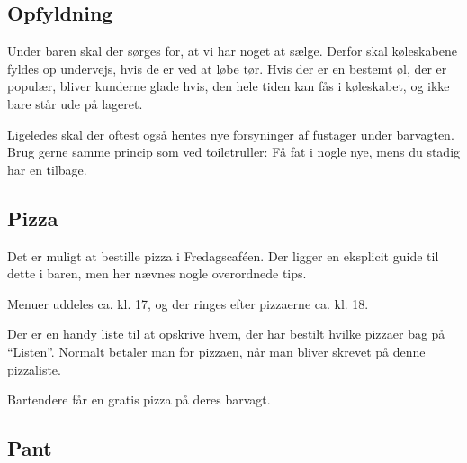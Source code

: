 \subsection{Opfyldning}
\label{sec:intra:opfyldning}

Under baren skal der sørges for, at vi har noget at sælge. Derfor skal
køleskabene fyldes op undervejs, hvis de er ved at løbe tør. Hvis der
er en bestemt øl, der er populær, bliver kunderne glade hvis, den hele
tiden kan fås i køleskabet, og ikke bare står ude på lageret.

Ligeledes skal der oftest også hentes nye forsyninger af fustager
under barvagten. Brug gerne samme princip som ved toiletruller: Få fat
i nogle nye, mens du stadig har en tilbage.

\subsection{Pizza}
\label{sec:intra:pizza}

Det er muligt at bestille pizza i Fredagscaféen. Der ligger en
eksplicit guide til dette i baren, men her nævnes nogle overordnede tips.

Menuer uddeles ca. kl. 17, og der ringes efter pizzaerne ca. kl. 18.

Der er en handy liste til at opskrive hvem, der har bestilt hvilke
pizzaer bag på ``Listen''. Normalt betaler man for pizzaen, når man
bliver skrevet på denne pizzaliste.

Bartendere får en gratis pizza på deres barvagt.

\subsection{Pant}
\label{sec:intra:pant}

